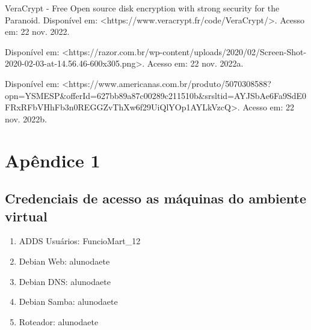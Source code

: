 \documentclass[12pt]{article}
\begin{document}
VeraCrypt - Free Open source disk encryption with strong security for the Paranoid. Disponível em: <https://www.veracrypt.fr/code/VeraCrypt/>. Acesso em: 22 nov. 2022.

Disponível em: <https://razor.com.br/wp-content/uploads/2020/02/Screen-Shot-2020-02-03-at-14.56.46-600x305.png>. Acesso em: 22 nov. 2022a.

Disponível em: <https://www.americanas.com.br/produto/5070308588?opn=YSMESP&offerId=627bb89a87c00289c211510b&srsltid=AYJSbAe6Fa9SdE0FRxRFbVHhFb3n0REGGZvThXw6f29UiQlYOp1AYLkVzcQ>. Acesso em: 22 nov. 2022b.
\section{Apêndice 1}
\subsection{Credenciais de acesso as máquinas do ambiente virtual}
\begin{enumerate}
    \item ADDS Usuários: FuncioMart\_12
    \item Debian Web: alunodaete
    \item Debian DNS: alunodaete
    \item Debian Samba: alunodaete
    \item Roteador: alunodaete
\end{enumerate}
\end{document}
